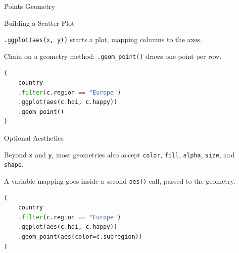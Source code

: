 \documentclass[8pt,aspectratio=169]{beamer}
\begin{document}
\begin{rightframe}{Points Geometry}
\end{rightframe}

\begin{frame}[fragile]{Building a Scatter Plot}
\begin{splitcode}{%

\texttt{.ggplot(aes(x, y))} starts a plot, mapping columns to the axes.

Chain on a geometry method: \texttt{.geom\_point()} draws one point per row.

}
\begin{lstlisting}[language=Python]
(
    country
    .filter(c.region == "Europe")
    .ggplot(aes(c.hdi, c.happy))
    .geom_point()
)
\end{lstlisting}
\end{splitcode}
\end{frame}

\begin{frame}[fragile]{Optional Aesthetics}
\begin{splitcode}{%

Beyond \texttt{x} and \texttt{y}, most geometries also accept \texttt{color}, \texttt{fill}, \texttt{alpha}, \texttt{size}, and \texttt{shape}.

A variable mapping goes inside a second \texttt{aes()} call, passed to the geometry.

}
\begin{lstlisting}[language=Python]
(
    country
    .filter(c.region == "Europe")
    .ggplot(aes(c.hdi, c.happy))
    .geom_point(aes(color=c.subregion))
)
\end{lstlisting}
\end{splitcode}
\end{frame}
\end{document}
